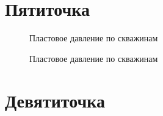 \documentclass[14pt]{article}
\begin{document}
	\section{Пятиточка}
\begin{figure}
	\caption{Пластовое давление по скважинам}
	\label{fig:map}
\end{figure}
\begin{figure}
	\caption{Пластовое давление по скважинам}
	\label{fig:map}
\end{figure}
\begin{figure}
\end{figure}
\begin{figure}
\end{figure}

	\section{Девятиточка}
	\begin{figure}
	\end{figure}
	\begin{figure}
	\end{figure}
	\begin{figure}
	\end{figure}
	\begin{figure}
	\end{figure}
\end{document}
